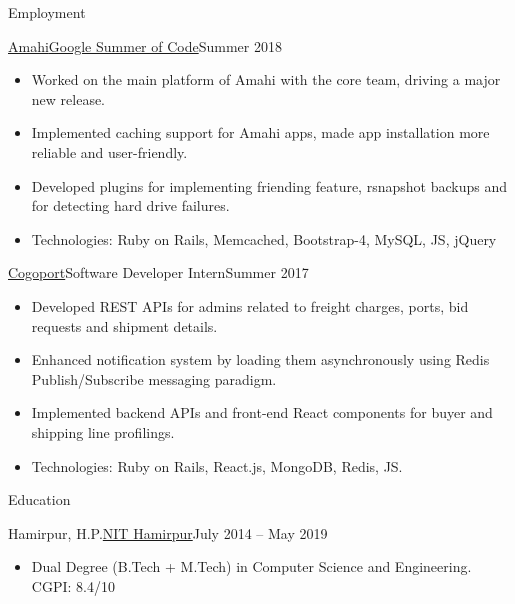 \documentclass[]{mcdowellcv}
\begin{document}
	\makeheader
	
	\begin{cvsection}{Employment}
		\begin{cvsubsection}{\href {https://sukhbir-singh.github.io/blog/2018-08-05/gsoc-2018-final-submission-report}{Amahi}}{\href {https://summerofcode.withgoogle.com/}{Google Summer of Code}}{Summer 2018}
			\begin{itemize}
				\item Worked on the main platform of Amahi with the core team, driving a major new release.
				\item Implemented caching support for Amahi apps, made app installation more reliable and user-friendly.
				\item Developed plugins for implementing friending feature, rsnapshot backups and for detecting hard drive failures.
				\item Technologies: Ruby on Rails,  Memcached, Bootstrap-4, MySQL, JS, jQuery
			\end{itemize}
		\end{cvsubsection}
		\begin{cvsubsection}{\href {http://www.cogoport.com/}{Cogoport}}{Software Developer Intern}{Summer 2017}			
			\begin{itemize}
				\item Developed REST APIs for admins related to freight charges, ports, bid requests and shipment details.
				\item Enhanced notification system by loading them asynchronously using Redis Publish/Subscribe messaging paradigm.
				\item Implemented backend APIs and front-end React components for buyer and shipping line profilings.
				\item Technologies: Ruby on Rails, React.js, MongoDB, Redis, JS.
			\end{itemize}
		\end{cvsubsection}
	\end{cvsection}
	
	\begin{cvsection}{Education}
		\begin{cvsubsection}{Hamirpur, H.P.}{\href {http://nith.ac.in/}{NIT Hamirpur}}{July 2014 -- May 2019}
			\begin{itemize}
				\item Dual Degree (B.Tech + M.Tech) in Computer Science and Engineering. CGPI: 8.4/10
			\end{itemize}
		\end{cvsubsection}
	\end{cvsection}
	
\end{document}
